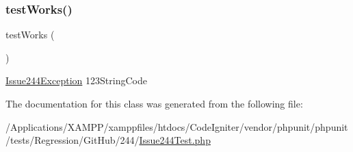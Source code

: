 \subsubsection{\texorpdfstring{test\+Works()}{testWorks()}}
{\footnotesize\ttfamily test\+Works (\begin{DoxyParamCaption}{ }\end{DoxyParamCaption})}

\mbox{\hyperlink{class_issue244_exception}{Issue244\+Exception}}  123\+String\+Code 

The documentation for this class was generated from the following file\+:\begin{DoxyCompactItemize}
\item 
/\+Applications/\+X\+A\+M\+P\+P/xamppfiles/htdocs/\+Code\+Igniter/vendor/phpunit/phpunit/tests/\+Regression/\+Git\+Hub/244/\mbox{\hyperlink{_issue244_test_8php}{Issue244\+Test.\+php}}\end{DoxyCompactItemize}
